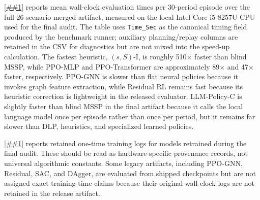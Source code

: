 \documentclass[10pt,a4paper]{article}
\providecommand{\Cref}[1]{\ref{##1}}
\begin{document}
\Cref{tab:compute_times} reports mean wall-clock evaluation times
per 30-period episode over the full 26-scenario merged artifact,
measured on the local Intel Core i5-8257U CPU used for the final audit.
The table uses
\texttt{Time\_Sec} as the canonical timing field produced by the
benchmark runner; auxiliary planning/replay columns are retained in the
CSV for diagnostics but are not mixed into the speed-up calculation.
The fastest heuristic, $(s,S)$-I, is roughly 510$\times$ faster than
blind MSSP, while PPO-MLP and PPO-Transformer are approximately
89$\times$ and 47$\times$ faster, respectively. PPO-GNN is slower than
flat neural policies because it invokes graph feature extraction, while
Residual RL remains fast because its heuristic correction is lightweight
in the released evaluator. LLM-Policy-C is slightly faster than blind
MSSP in the final artifact because it calls the local language model
once per episode rather than once per period, but it remains far slower
than DLP, heuristics, and specialized learned policies.

\Cref{tab:training_times} reports retained one-time training logs for
models retrained during the final audit. These should be read as
hardware-specific provenance records, not universal algorithmic
constants. Some legacy artifacts, including PPO-GNN, Residual, SAC, and
DAgger, are evaluated from shipped checkpoints but are not assigned exact
training-time claims because their original wall-clock logs are not
retained in the release artifact.
\end{document}
